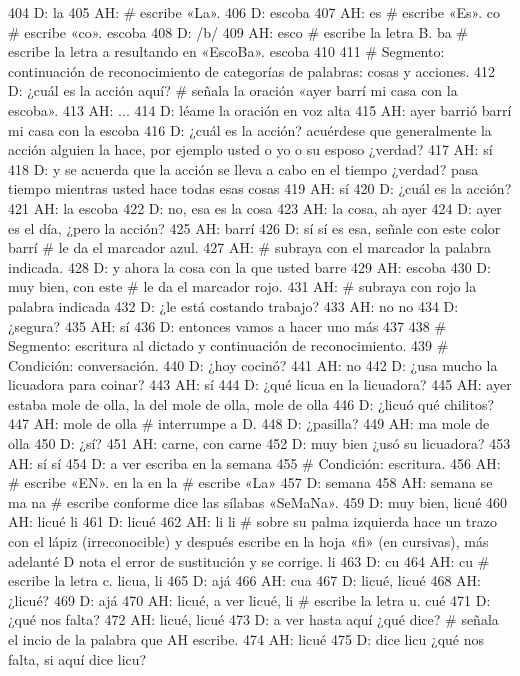 404 D: la
405 AH: # escribe «La».
406 D: escoba
407 AH: es # escribe «Es». co # escribe «co». escoba
408 D: /b/
409 AH: esco # escribe la letra B. ba # escribe la letra a resultando en «EscoBa». escoba
410 
411 # Segmento: continuación de reconocimiento de categorías de palabras: cosas y acciones.
412 D: ¿cuál es la acción aquí? # señala la oración «ayer barrí mi casa con la escoba».
413 AH: ...
414 D: léame la oración en voz alta
415 AH: ayer barrió barrí mi casa con la escoba
416 D: ¿cuál es la acción? acuérdese que generalmente la acción alguien la hace, por ejemplo usted o yo o su esposo ¿verdad?
417 AH: sí
418 D: y se acuerda que la acción se lleva a cabo en el tiempo ¿verdad? pasa tiempo mientras usted hace todas esas cosas
419 AH: sí
420 D: ¿cuál es la acción?
421 AH: la escoba
422 D: no, esa es la cosa
423 AH: la cosa, ah ayer
424 D: ayer es el día, ¿pero la acción?
425 AH: barrí
426 D: sí sí es esa, señale con este color barrí # le da el marcador azul.
427 AH: # subraya con el marcador la palabra indicada.
428 D: y ahora la cosa con la que usted barre
429 AH: escoba
430 D: muy bien, con este # le da el marcador rojo.
431 AH: # subraya con rojo la palabra indicada
432 D: ¿le está costando trabajo?
433 AH: no no
434 D: ¿segura?
435 AH: sí
436 D: entonces vamos a hacer uno más
437 
438 # Segmento: escritura al dictado y continuación de reconocimiento.
439 # Condición: conversación.
440 D: ¿hoy cocinó?
441 AH: no
442 D: ¿usa mucho la licuadora para coinar?
443 AH: sí
444 D: ¿qué licua en la licuadora?
445 AH: ayer estaba mole de olla, la del mole de olla, mole de olla
446 D: ¿licuó qué chilitos?
447 AH: mole de olla # interrumpe a D.
448 D: ¿pasilla?
449 AH: ma mole de olla
450 D: ¿sí?
451 AH: carne, con carne
452 D: muy bien ¿usó su licuadora?
453 AH: sí sí
454 D: a ver escriba en la semana
455 # Condición: escritura.
456 AH: # escribe «EN». en la en la # escribe «La»
457 D: semana
458 AH: semana se ma na # escribe conforme dice las sílabas «SeMaNa».
459 D: muy bien, licué
460 AH: licué li
461 D: licué
462 AH: li li # sobre su palma izquierda hace un trazo con el lápiz (irreconocible) y después escribe en la hoja «fi» (en cursivas), más adelanté D nota el error de sustitución y se corrige. li
463 D: cu
464 AH: cu # escribe la letra c. licua, li
465 D: ajá
466 AH: cua
467 D: licué, licué
468 AH: ¿licué?
469 D: ajá
470 AH: licué, a ver licué, li # escribe la letra u. cué
471 D: ¿qué nos falta?
472 AH: licué, licué
473 D: a ver hasta aquí ¿qué dice? # señala el incio de la palabra que AH escribe.
474 AH: licué
475 D: dice licu ¿qué nos falta, si aquí dice licu?
